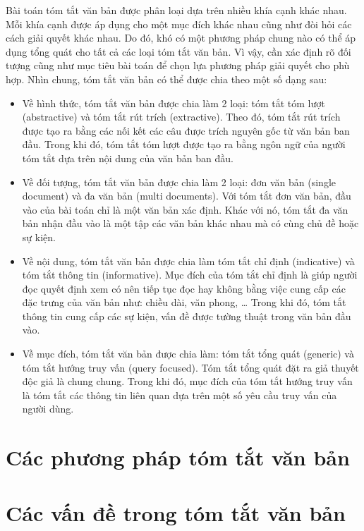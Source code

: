 Bài toán tóm tắt văn bản được phân loại dựa trên nhiều khía cạnh khác nhau. Mỗi khía cạnh được áp dụng cho một mục đích khác nhau cũng như đòi hỏi các cách giải quyết khác nhau. Do đó, khó có một phương pháp chung nào có thể áp dụng tổng quát cho tất cả các loại tóm tắt văn bản. Vì vậy, cần xác định rõ đối tượng cũng như mục tiêu bài toán để chọn lựa phương pháp giải quyết cho phù hợp. Nhìn chung, tóm tắt văn bản có thể được chia theo một số dạng sau:
\begin{itemize}
	\item Về hình thức, tóm tắt văn bản được chia làm 2 loại: tóm tắt tóm lượt (abstractive) và tóm tắt rút trích (extractive). Theo đó, tóm tắt rút trích được tạo ra bằng các nối kết các câu được trích nguyên gốc từ văn bản ban đầu. Trong khi đó, tóm tắt tóm lượt được tạo ra bằng ngôn ngữ của người tóm tắt dựa trên nội dung của văn bản ban đầu. 
	\item Về đối tượng, tóm tắt văn bản được chia làm 2 loại: đơn văn bản (single document) và đa văn bản (multi documents). Với tóm tắt đơn văn bản, đầu vào của bài toán chỉ là một văn bản xác định. Khác với nó, tóm tắt đa văn bản nhận đầu vào là một tập các văn bản khác nhau mà có cùng chủ đề hoặc sự kiện.
	\item Về nội dung, tóm tắt văn bản được chia làm tóm tắt chỉ định (indicative) và tóm tắt thông tin (informative). Mục đích của tóm tắt chỉ định là giúp người đọc quyết định xem có nên tiếp tục đọc hay không bằng việc cung cấp các đặc trưng của văn bản như: chiều dài, văn phong, … Trong khi đó, tóm tắt thông tin cung cấp các sự kiện, vấn đề được tường thuật trong văn bản đầu vào.
	\item Về mục đích, tóm tắt văn bản được chia làm: tóm tắt tổng quát (generic) và tóm tắt hướng truy vấn (query focused). Tóm tắt tổng quát đặt ra giả thuyết độc giả là chung chung. Trong khi đó, mục đích của tóm tắt hướng truy vấn là tóm tắt các thông tin liên quan dựa trên một số yêu cầu truy vấn của người dùng. 
\end{itemize}


\section{Các phương pháp tóm tắt văn bản}



\section{Các vấn đề trong tóm tắt văn bản}

